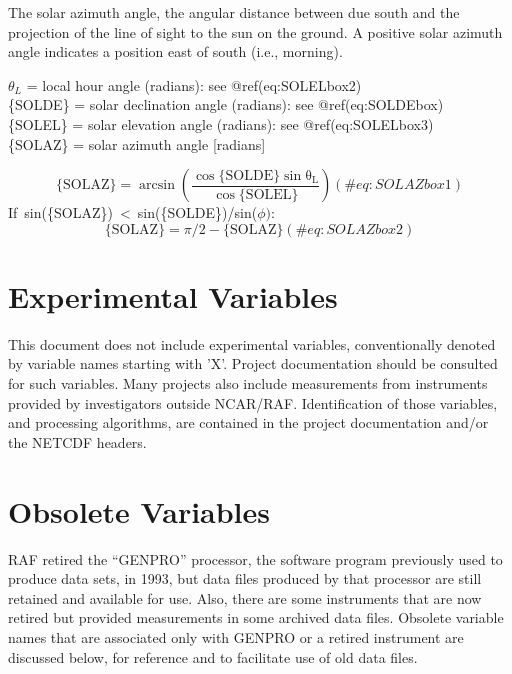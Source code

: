\documentclass[
  english,
]{book}
\begin{document}
The solar azimuth angle, the angular distance between due south and the
projection of the line of sight to the sun on the ground. A positive
solar azimuth angle indicates a position east of south (i.e., morning).

\(\theta_{L}\) = local hour angle (radians): see @ref(eq:SOLELbox2)\\
\{SOLDE\} = solar declination angle (radians): see @ref(eq:SOLDEbox)\\
\{SOLEL\} = solar elevation angle (radians): see @ref(eq:SOLELbox3)\\
\{SOLAZ\} = solar azimuth angle {[}radians{]}

\begin{equation}
\mathrm{\{SOLAZ\}=\arcsin\left(\frac{\cos\mathrm{\{SOLDE\}\sin\theta_{L}}}{\cos\mathrm{\{SOLEL\}}}\right)}
(\#eq:SOLAZbox1)
\end{equation}
If~sin(\{SOLAZ\})~\textless~sin(\{SOLDE\})/sin(\(\phi):\)\\
\begin{equation}
\mathrm{\{SOLAZ\}} = \pi/2-\mathrm{\{SOLAZ\}}
(\#eq:SOLAZbox2)
\end{equation}

\hypertarget{experimental-variables}{%
\chapter{Experimental Variables}\label{experimental-variables}}

This document does not include experimental variables, conventionally
denoted by variable names starting with 'X'. Project documentation
should be consulted for such variables. Many projects also include
measurements from instruments provided by investigators outside
NCAR/RAF. Identification of those variables, and processing algorithms,
are contained in the project documentation and/or the NETCDF headers.

\hypertarget{obsolete-variables}{%
\chapter{Obsolete Variables}\label{obsolete-variables}}

RAF retired the ``GENPRO'' processor, the software program previously
used to produce data sets, in 1993, but data files produced by that
processor are still retained and available for use. Also, there are some
instruments that are now retired but provided measurements in some
archived data files. Obsolete variable names that are associated only
with GENPRO or a retired instrument are discussed below, for reference
and to facilitate use of old data files.
\end{document}
